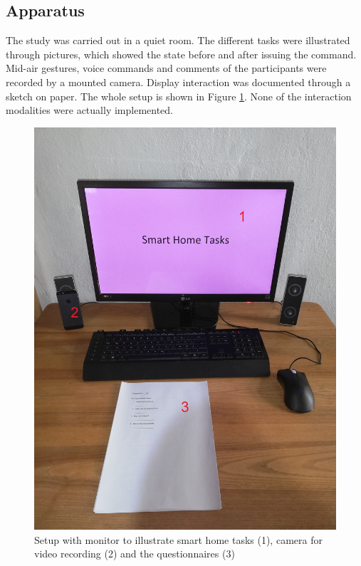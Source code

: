\documentclass[sigchi]{acmart}
\begin{document}
	\subsection{Apparatus}
	The study was carried out in a quiet room. The different tasks were illustrated through pictures, which showed the state before and after issuing the command. Mid-air gestures, voice commands and comments of the participants were recorded by a mounted camera. Display interaction was documented through a sketch on paper. The whole setup is shown in Figure \ref{figure:Setup}. None of the interaction modalities were actually implemented.
	\begin{figure}			
		\centering
		\includegraphics[width=\columnwidth]{SetupZahlen}
		\caption{Setup with monitor to illustrate smart home tasks (1), camera for video recording (2) and the questionnaires (3)}
		\label{figure:Setup}
	\end{figure}
	
\end{document}
